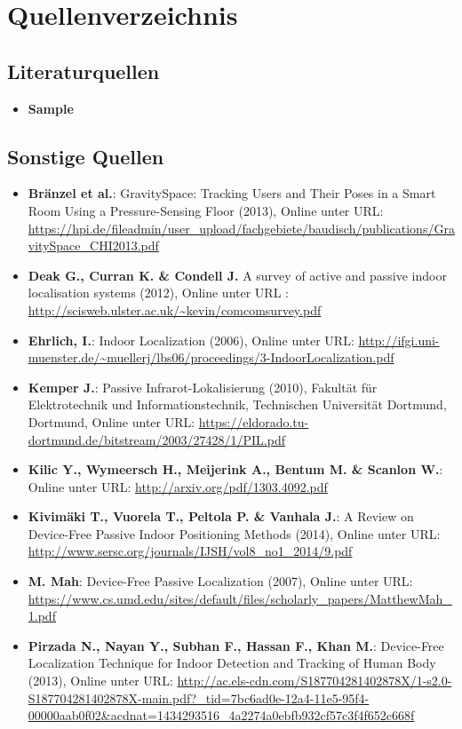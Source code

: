 \newpage

\section{Quellenverzeichnis}
\subsection*{Literaturquellen}
\begin{itemize}[leftmargin=*]
\item[] \textbf{Sample}
\end{itemize}
\subsection*{Sonstige Quellen}
\begin{itemize}[leftmargin=*]
\item[] \textbf{Bränzel et al.}: GravitySpace: Tracking Users and Their Poses in a Smart Room Using a Pressure-Sensing Floor (2013), Online unter URL: \url{https://hpi.de/fileadmin/user_upload/fachgebiete/baudisch/publications/GravitySpace_CHI2013.pdf}
\item[] \textbf{Deak G., Curran K. \& Condell J.} A survey of active and passive indoor localisation systems (2012), Online unter URL : \url{http://scisweb.ulster.ac.uk/~kevin/comcomsurvey.pdf}
\item[] \textbf{Ehrlich, I.}: Indoor Localization (2006), Online unter URL: \url{http://ifgi.uni-muenster.de/~muellerj/lbs06/proceedings/3-IndoorLocalization.pdf}
\item[] \textbf{Kemper J.}: Passive Infrarot-Lokalisierung (2010), Fakultät für Elektrotechnik und Informationstechnik, Technischen Universität Dortmund, Dortmund, Online unter URL: \url{https://eldorado.tu-dortmund.de/bitstream/2003/27428/1/PIL.pdf}
\item[] \textbf{Kilic Y., Wymeersch H., Meijerink A., Bentum M. \& Scanlon W.}: Online unter URL: \url{http://arxiv.org/pdf/1303.4092.pdf}
\item[] \textbf{Kivimäki T., Vuorela T., Peltola P. \& Vanhala J.}: A Review on Device-Free Passive Indoor Positioning Methods (2014), Online unter URL: \url{http://www.sersc.org/journals/IJSH/vol8_no1_2014/9.pdf}
\item[] \textbf{M. Mah}: Device-Free Passive Localization (2007), Online unter URL: \url{https://www.cs.umd.edu/sites/default/files/scholarly_papers/MatthewMah_1.pdf}
\item[] \textbf{Pirzada N., Nayan Y., Subhan F., Hassan F., Khan M.}: Device-Free Localization Technique for Indoor Detection and Tracking of Human Body (2013), Online unter URL: \url{http://ac.els-cdn.com/S187704281402878X/1-s2.0-S187704281402878X-main.pdf?_tid=7bc6ad0e-12a4-11e5-95f4-00000aab0f02&acdnat=1434293516_4a2274a0ebfb932cf57c3f4f652c668f}

\end{itemize}
